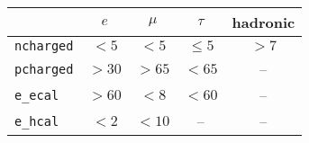 \begin{tabular}{lcccc}
	\toprule
	 & $e$ & $\mu$ & $\tau$ & hadronic \\
	 \midrule
	\texttt{ncharged} & $<5$  & $<5$  & $\leq 5$ & $>7$ \\
	\texttt{pcharged} & $>30$ & $>65$ & $<65$ & --\\
	\texttt{e\_ecal}  & $>60$ & $<8$  & $<60$ & -- \\
	\texttt{e\_hcal}  & $<2$  & $<10$ & -- & -- \\
	\bottomrule
\end{tabular}
